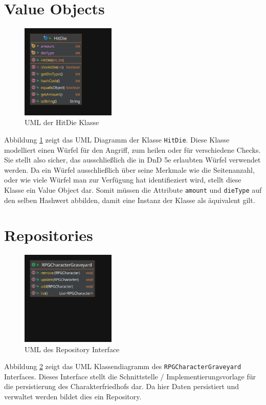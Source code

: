 \section{Value Objects}
\begin{figure}[H]
	\centering
	\includegraphics[width=0.4\textwidth]{Bilder/HitDie.pdf}
	\caption{UML der HitDie Klasse}
	\label{fig:HitDie}
\end{figure}
Abbildung \ref{fig:HitDie} zeigt das UML Diagramm der Klasse \texttt{HitDie}. Diese Klasse modelliert einen Würfel für den Angriff, zum heilen oder für verschiedene Checks. Sie stellt also sicher, das ausschließlich die in DnD 5e erlaubten Würfel verwendet werden. Da ein Würfel ausschließlich über seine Merkmale wie die Seitenanzahl, oder wie viele Würfel man zur Verfügung hat identifieziert wird, stellt diese Klasse ein Value Object dar. Somit müssen die Attribute \texttt{amount} und \texttt{dieType} auf den selben Hashwert abbilden, damit eine Instanz der Klasse als äquivalent gilt.

\section{Repositories}
\begin{figure}[H]
	\centering
	\includegraphics[width=0.4\textwidth]{Bilder/RPGCharacterGraveyard.pdf}
	\caption{UML des Repository Interface}
	\label{fig:Repository}
\end{figure}
Abbildung \ref{fig:Repository} zeigt das UML Klassendiagramm des \texttt{RPGCharacterGraveyard} Interfaces. Dieses Interface stellt die Schnittstelle / Implementierungsvorlage für die persistierung des Charakterfriedhofs dar. Da hier Daten persistiert und verwaltet werden bildet dies ein Repository.

